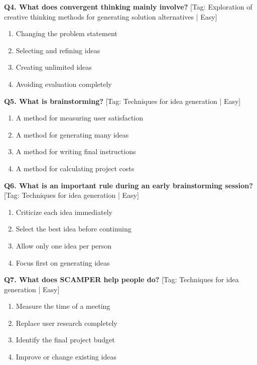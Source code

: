 \noindent\textbf{Q4. What does convergent thinking mainly involve?} \hfill [Tag: Exploration of creative thinking methods for generating solution alternatives | Easy]
\begin{enumerate}[label=(\alph*),topsep=2pt,itemsep=1pt,partopsep=0pt,parsep=0pt]
    \item {Changing the problem statement}
    \item {Selecting and refining ideas}
    \item {Creating unlimited ideas}
    \item {Avoiding evaluation completely}
\end{enumerate}
\vspace{2mm}

\noindent\textbf{Q5. What is brainstorming?} \hfill [Tag: Techniques for idea generation | Easy]
\begin{enumerate}[label=(\alph*),topsep=2pt,itemsep=1pt,partopsep=0pt,parsep=0pt]
    \item {A method for measuring user satisfaction}
    \item {A method for generating many ideas}
    \item {A method for writing final instructions}
    \item {A method for calculating project costs}
\end{enumerate}
\vspace{2mm}

\noindent\textbf{Q6. What is an important rule during an early brainstorming session?} \hfill [Tag: Techniques for idea generation | Easy]
\begin{enumerate}[label=(\alph*),topsep=2pt,itemsep=1pt,partopsep=0pt,parsep=0pt]
    \item {Criticize each idea immediately}
    \item {Select the best idea before continuing}
    \item {Allow only one idea per person}
    \item {Focus first on generating ideas}
\end{enumerate}
\vspace{2mm}

\noindent\textbf{Q7. What does SCAMPER help people do?} \hfill [Tag: Techniques for idea generation | Easy]
\begin{enumerate}[label=(\alph*),topsep=2pt,itemsep=1pt,partopsep=0pt,parsep=0pt]
    \item {Measure the time of a meeting}
    \item {Replace user research completely}
    \item {Identify the final project budget}
    \item {Improve or change existing ideas}
\end{enumerate}
\vspace{2mm}


